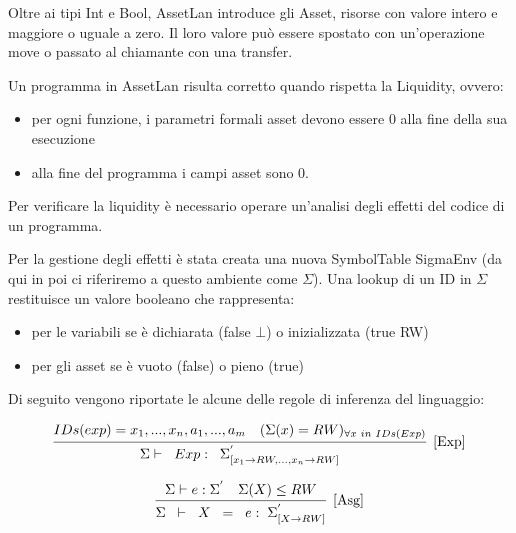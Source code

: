 \documentclass[12pt,twoside,openright,a4paper]{report}
\begin{document}
Oltre ai tipi Int e Bool, AssetLan introduce gli Asset, risorse con valore intero e maggiore o uguale a zero. Il loro valore può essere spostato con un'operazione move o passato al chiamante con una transfer.

Un programma in AssetLan risulta corretto quando  rispetta la Liquidity, ovvero:  
\begin{itemize}
    \item per ogni funzione, i parametri formali asset devono essere 0 alla fine della sua esecuzione
	\item alla fine del programma i campi asset sono 0.
\end{itemize}

Per verificare la liquidity è necessario operare un'analisi degli effetti del codice di un programma.

Per la gestione degli effetti è stata creata una nuova SymbolTable SigmaEnv (da qui in poi ci riferiremo a questo ambiente come $\Sigma$). Una lookup di un ID in $\Sigma$ restituisce un valore booleano che rappresenta:

\begin{itemize}
    \item per le variabili se è dichiarata (false $\bot$) o inizializzata (true RW)
    \item per gli asset se è vuoto (false) o pieno (true)
\end{itemize}

Di seguito vengono riportate le alcune delle regole di inferenza del linguaggio:


    \begin{align*}
    \infer[\mathrm{[Exp]}]
    {\Sigma \vdash \hspace{0.2cm}  Exp :\hspace{0.2cm} \Sigma^{'}_{[x_{1} \to RW, ..., x_{n} \to RW]} }
    { IDs(exp) = {x_{1}, ..., x_{n},a_{1}, ..., a_{m}} & (\Sigma(x) = RW)_{\forall{x \hspace{0.1cm}in \hspace{0.1cm} IDs(Exp)}} }
    \end{align*}
    
    \begin{align*}
    \infer[\mathrm{[Asg]}]
    {\Sigma  \hspace{0.2cm} \vdash \hspace{0.2cm} X \hspace{0.2cm} = \hspace{0.2cm}  e : \hspace{0.1cm} \Sigma^{'}_{[X \to RW]} }
    { \Sigma \vdash e :\Sigma^{'} & \Sigma(X) \leq RW }
    \end{align*}
\end{document}
